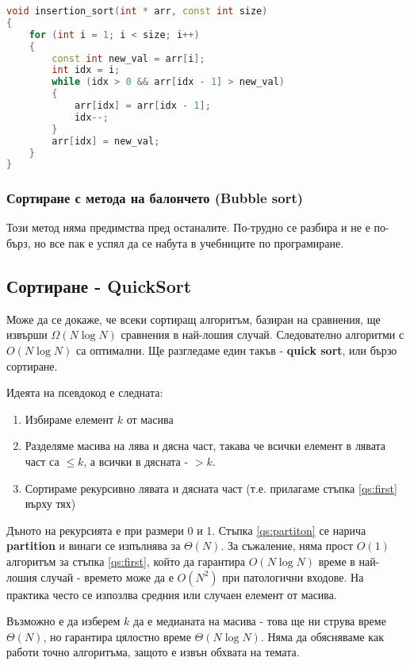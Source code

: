 \documentclass[fleqn,12pt]{article}
\begin{document}
\begin{lstlisting}[language=C++, caption=Insertion sort]
void insertion_sort(int * arr, const int size)
{
    for (int i = 1; i < size; i++)
    {
        const int new_val = arr[i];
        int idx = i;
        while (idx > 0 && arr[idx - 1] > new_val)
        {
            arr[idx] = arr[idx - 1];
            idx--; 
        }
        arr[idx] = new_val;
    }
}
\end{lstlisting}

\subsubsection{Сортиране с метода на балончето (Bubble sort)}
Този метод няма предимства пред останалите. По-трудно се разбира и не е по-бърз, но все пак е успял 
да се набута в учебниците по програмиране.

\subsection{Сортиране - QuickSort}
Може да се докаже, че всеки сортиращ алгоритъм, базиран на сравнения, ще извърши $\Omega(N \log N)$ сравнения в най-лошия случай.
Следователно алгоритми с $O(N \log N)$ са оптимални. Ще разгледаме един такъв - \textbf{quick sort}, или бързо сортиране.

Идеята на псевдокод е следната:
\begin{enumerate}
    \item \label{qs:first} Избираме елемент $k$ от масива
    \item \label{qs:partiton} Разделяме масива на лява и дясна част, такава че всички елемент в лявата част са $\leq k$, а всички в дясната - $> k$.
    \item Сортираме рекурсивно лявата и дясната част (т.е. прилагаме стъпка \ref{qs:first} върху тях)
\end{enumerate}

Дъното на рекурсията е при размери 0 и 1. Стъпка \ref{qs:partiton} се нарича \textbf{partition} и винаги се изпълнява за $\Theta(N)$.
За съжаление, няма прост $O(1)$ алгоритъм за стъпка \ref{qs:first}, който да гарантира $O(N \log N)$ време в най-лошия случай - времето може да е $O(N^2)$
при патологични входове. На практика често се изпозлва средния или случаен елемент от масива.

Възможно е да изберем $k$ да е медианата на масива - това ще ни струва време $\Theta(N)$, но гарантира цялостно време $\Theta(N \log N)$.
Няма да обясняваме как работи точно алгоритъма, защото е извън обхвата на темата.
\end{document}
